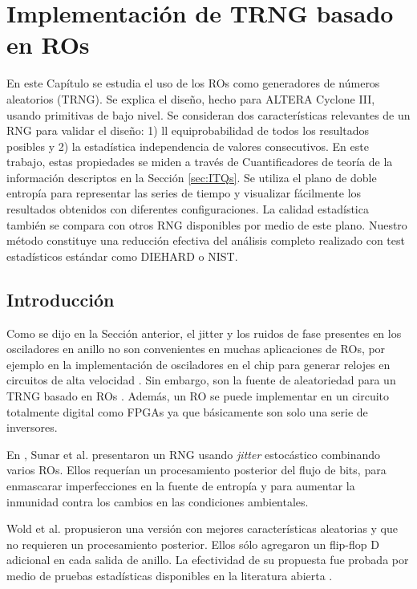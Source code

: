 \section{Implementación de {TRNG} basado en {RO}s}

En este Capítulo se estudia el uso de los {RO}s como generadores de números aleatorios ({TRNG}).
Se explica el diseño, hecho para {ALTERA Cyclone} III, usando primitivas de bajo nivel.
Se consideran dos características relevantes de un {RNG} para validar el diseño: 1) ll equiprobabilidad de todos los resultados posibles y 2) la estadística independencia de valores consecutivos.
En este trabajo, estas propiedades se miden a través de Cuantificadores de teoría de la información descriptos en la Sección \ref{sec:ITQs}.
Se utiliza el plano de doble entropía para representar las series de tiempo y visualizar fácilmente los resultados obtenidos con diferentes configuraciones.
La calidad estadística también se compara con otros {RNG} disponibles por medio de este plano.
Nuestro método constituye una reducción efectiva del análisis completo realizado con test estadísticos estándar como {DIEHARD} o {NIST}.

\subsection{Introducción}
\label{sec:IntroROTRNG}

Como se dijo en la Sección anterior, el jitter y los ruidos de fase presentes en los osciladores en anillo no son convenientes en muchas aplicaciones de {RO}s, por ejemplo en la implementación de {osciladores en el chip} para generar relojes en circuitos de alta velocidad \cite{Hajimiri1999, Mandal2010, Gupta2011}.
Sin embargo, son la fuente de aleatoriedad para un {TRNG} basado en {RO}s \cite{Sunar2007, Wold2009}.
Además, un {RO} se puede implementar en un circuito totalmente digital como {FPGA}s ya que básicamente son solo una serie de inversores.

En \cite{Sunar2007}, Sunar et al. presentaron un {RNG} usando \textit{jitter} estocástico combinando varios {RO}s.
Ellos requerían un procesamiento posterior del flujo de bits, para enmascarar imperfecciones en la fuente de entropía y para aumentar la inmunidad contra los cambios en las condiciones ambientales.

Wold et al. \cite{Wold2009} propusieron una versión con mejores características aleatorias y que no requieren un procesamiento posterior.
Ellos sólo agregaron un flip-flop D adicional en cada salida de anillo.
La efectividad de su propuesta fue probada por medio de pruebas estadísticas disponibles en la literatura abierta \cite{NIST2000, Marsaglia1995, NIST2000a}.

